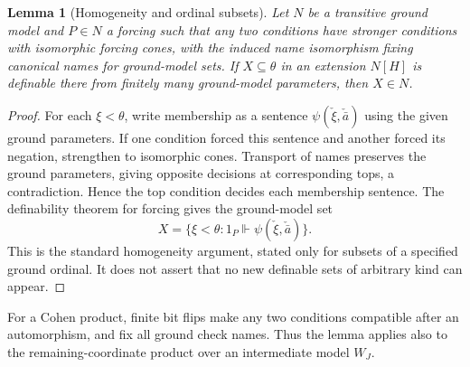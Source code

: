 \documentclass[11pt,a4paper]{article}
\numberwithin{equation}{section}
\newtheorem{lemma}[lemma]{Lemma}
\theoremstyle{definition}
\theoremstyle{remark}
\begin{document}
\begin{lemma}[Homogeneity and ordinal subsets]\label{dsn:ca:lem:homogeneity}
Let $N$ be a transitive ground model and $P\in N$ a forcing such that
any two conditions have stronger conditions with isomorphic forcing
cones, with the induced name isomorphism fixing canonical names for
ground-model sets. If $X\subseteq\theta$ in an extension $N[H]$ is
definable there from finitely many ground-model parameters, then
$X\in N$.
\end{lemma}
\begin{proof}
For each $\xi<\theta$, write membership as a sentence
$\psi(\check\xi,\check{\bar a})$ using the given ground parameters.
If one condition forced this sentence and another forced its negation,
strengthen to isomorphic cones. Transport of names preserves the ground
parameters, giving opposite decisions at corresponding tops, a
contradiction. Hence the top condition decides each membership sentence.
The definability theorem for forcing gives the ground-model set
\[
 X=\{\xi<\theta:1_P\Vdash\psi(\check\xi,\check{\bar a})\}.
\]
This is the standard homogeneity argument, stated only for subsets of
a specified ground ordinal. It does not assert that no new definable
sets of arbitrary kind can appear.
\end{proof}

For a Cohen product, finite bit flips make any two conditions compatible
after an automorphism, and fix all ground check names. Thus the lemma
applies also to the remaining-coordinate product over an intermediate
model $W_J$.
\end{document}
